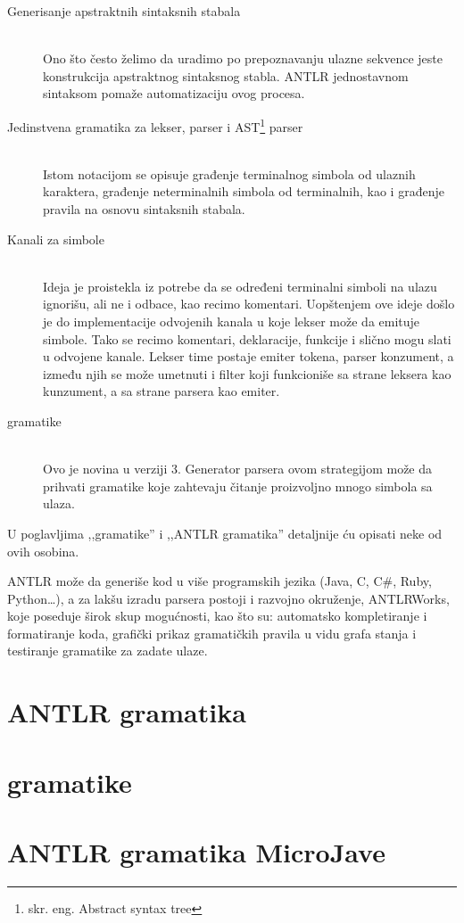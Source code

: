 \begin{description}
	\item[Generisanje apstraktnih sintaksnih stabala] \hfill \\
	Ono što često želimo da uradimo po prepoznavanju ulazne sekvence jeste konstrukcija apstraktnog sintaksnog stabla. ANTLR jednostavnom sintaksom pomaže automatizaciju ovog procesa.
	\item[Jedinstvena gramatika za lekser, parser i AST\footnote{skr. eng. Abstract syntax tree}  parser] \hfill \\
	Istom notacijom se opisuje građenje terminalnog simbola od ulaznih karaktera, građenje neterminalnih simbola od terminalnih, kao i građenje pravila na osnovu sintaksnih stabala.
	\item[Kanali za simbole] \hfill \\
	Ideja je proistekla iz potrebe da se određeni terminalni simboli na ulazu ignorišu, ali ne i odbace, kao recimo komentari. Uopštenjem ove ideje došlo je do implementacije odvojenih kanala u koje lekser može da emituje simbole. Tako se recimo komentari, deklaracije, funkcije i slično mogu slati u odvojene kanale. Lekser time postaje emiter tokena, parser konzument, a između njih se može umetnuti i filter koji funkcioniše sa strane leksera kao kunzument, a sa strane parsera kao emiter.
	\item [\LLa gramatike] \hfill \\
	Ovo je novina u verziji 3. Generator parsera ovom strategijom može da prihvati gramatike koje zahtevaju čitanje proizvoljno mnogo simbola sa ulaza.

\end{description}

  U poglavljima ,,\LLa gramatike'' i ,,ANTLR gramatika'' detaljnije ću opisati neke od ovih osobina.
  
  ANTLR može da generiše kod u više programskih jezika (Java, C, C\#, Ruby, Python\ldots), a za lakšu izradu parsera postoji i razvojno okruženje, ANTLRWorks, koje poseduje širok skup mogućnosti, kao što su: automatsko kompletiranje i formatiranje koda, grafički prikaz gramatičkih pravila u vidu grafa stanja i testiranje gramatike za zadate ulaze.


\section{ANTLR gramatika}


\section{\LLa gramatike}





\section{ANTLR gramatika MicroJave}
